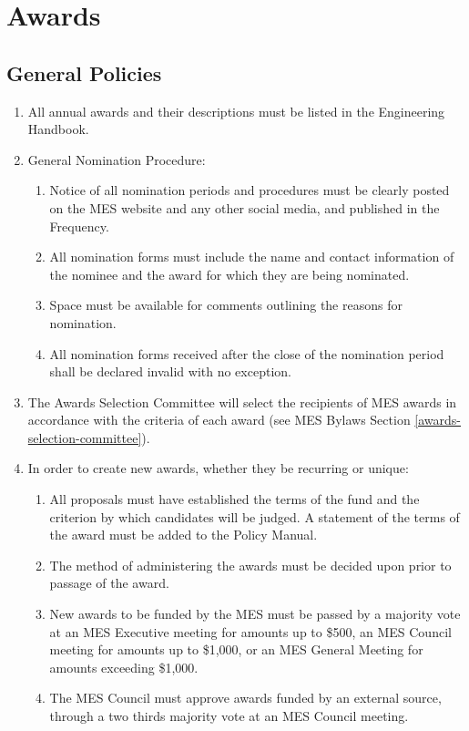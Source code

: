 \section{Awards}
\label{awards}

\subsection{General Policies}
\label{general-policies}
\begin{enumerate}
 \item
  All annual awards and their descriptions must be listed in the
  Engineering Handbook.
 \item
  General Nomination Procedure:

  \begin{enumerate}
   \item
    Notice of all nomination periods and procedures must be clearly
    posted on the MES website and any other social media, and published
    in the Frequency.
   \item
    All nomination forms must include the name and contact information
    of the nominee and the award for which they are being nominated.
   \item
    Space must be available for comments outlining the reasons for
    nomination.
   \item
    All nomination forms received after the close of the nomination
    period shall be declared invalid with no exception.
  \end{enumerate}
 \item
  The Awards Selection Committee will select the recipients of MES
  awards in accordance with the criteria of each award (see MES Bylaws
  Section \ref{awards-selection-committee}).
 \item
  In order to create new awards, whether they be recurring or unique:

  \begin{enumerate}
   \item
    All proposals must have established the terms of the fund and the
    criterion by which candidates will be judged. A statement of the
    terms of the award must be added to the Policy Manual. %
   \item
    The method of administering the awards must be decided upon prior to
    passage of the award.
   \item
    New awards to be funded by the MES must be passed by a majority vote
    at an MES Executive meeting for amounts up to \$500, an MES Council
    meeting for amounts up to \$1,000, or an MES General Meeting for
    amounts exceeding \$1,000.
   \item
    The MES Council must approve awards funded by an external source,
    through a two thirds majority vote at an MES Council meeting.
  \end{enumerate}
\end{enumerate}

